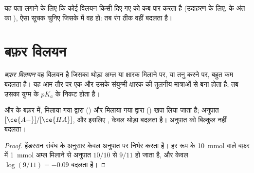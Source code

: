 \begin{method}[सूचक चुनना]\label{met:g12:buffers-predominance:indicator}
यह पता लगाने के लिए कि कोई विलयन किसी दिए गए  को कब पार करता है (उदाहरण के लिए,
 के अंत का ), ऐसा सूचक चुनिए जिसके  में
वह  हो: तब रंग ठीक वहीं बदलता है।
\end{method}

\section{बफ़र विलयन}

\begin{definition}[बफ़र विलयन]\label{def:g12:buffers-predominance:buffer}
\emph{बफ़र विलयन} वह विलयन है जिसका 
थोड़ा अम्ल या क्षारक मिलाने पर, या तनु करने पर, बहुत कम
बदलता है। यह आम तौर पर एक  और उसके संयुग्मी क्षारक की
तुलनीय मात्राओं से बना होता है; तब उसका  युग्म के $pK_a$ के निकट होता है।
\end{definition}

\begin{proposition}[बफ़र प्रतिरोध क्यों करता है]\label{prop:g12:buffers-predominance:buffer}
 और  के बफ़र में, मिलाया गया 
 द्वारा () और मिलाया गया   द्वारा
() खपा लिया जाता है; अनुपात $[\ce{A-}]/[\ce{HA}]$, और इसलिए
, केवल थोड़ा बदलता है।  अनुपात को बिल्कुल नहीं बदलता।
\end{proposition}

\begin{proof}
हेंडरसन संबंध के अनुसार  केवल अनुपात पर निर्भर करता है। हर रूप के
\qty{10}{mmol} वाले बफ़र में \qty{1}{mmol} अम्ल मिलाने से
अनुपात $10/10$ से $9/11$ हो जाता है, और  केवल
$\log(9/11) = -0.09$ बदलता है।
\end{proof}

